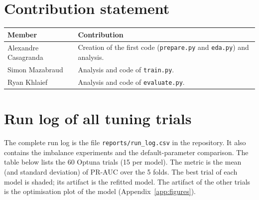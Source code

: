 \documentclass[11pt,a4paper]{article}
\begin{document}
\section*{Contribution statement}

\begin{table}[H]
\centering
\small
\begin{tabular}{lp{11cm}}
\toprule
\textbf{Member} & \textbf{Contribution} \\
\midrule
Alexandre Casagranda & Creation of the first code (\texttt{prepare.py} and \texttt{eda.py}) and analysis. \\
Simon Mazabraud & Analysis and code of \texttt{train.py}. \\
Ryan Khlaief & Analysis and code of \texttt{evaluate.py}. \\
\bottomrule
\end{tabular}
\end{table}

\newpage
\appendix

\section{Run log of all tuning trials}
\label{app:runlog}

The complete run log is the file \texttt{reports/run\_log.csv} in the repository. It also contains the imbalance experiments and the default-parameter comparison. The table below lists the 60 Optuna trials (15 per model). The metric is the mean (and standard deviation) of PR-AUC over the 5 folds. The best trial of each model is shaded; its artifact is the refitted model. The artifact of the other trials is the optimisation plot of the model (Appendix~\ref{app:figures}).
\end{document}
